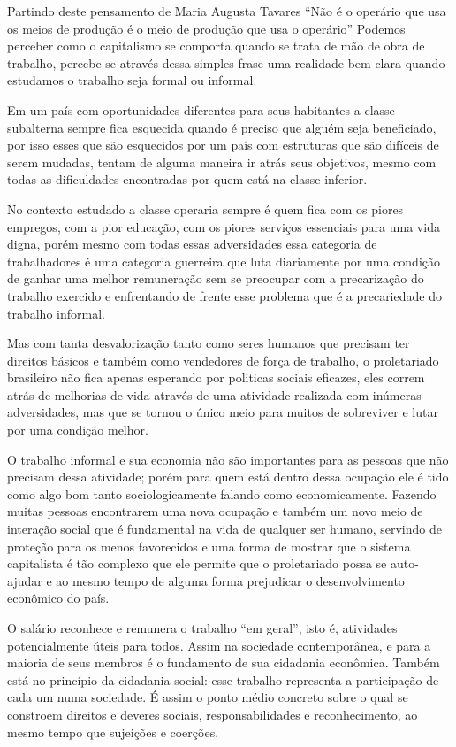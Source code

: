 Partindo deste pensamento de Maria Augusta Tavares ``Não é o operário que usa os meios de produção é o meio de produção
que usa o operário'' Podemos perceber como o capitalismo se comporta quando se trata de mão de obra de trabalho, 
percebe-se através dessa simples frase uma realidade bem clara quando estudamos o trabalho seja formal ou informal.

Em um país com oportunidades diferentes para seus habitantes a classe subalterna sempre fica esquecida quando é preciso
que alguém seja beneficiado, por isso esses que são esquecidos por um país com estruturas que são difíceis de serem 
mudadas, tentam de alguma maneira ir atrás seus objetivos, mesmo com todas as dificuldades encontradas por quem está
na classe inferior. 

No contexto estudado a classe operaria sempre é quem fica com os piores empregos, com a pior 
educação, com os piores serviços essenciais para uma vida digna, porém mesmo com todas essas adversidades essa categoria
de trabalhadores é uma categoria guerreira que luta diariamente por uma condição de ganhar uma melhor remuneração sem
se preocupar com a precarização do trabalho exercido e enfrentando de frente esse problema que é a precariedade do 
trabalho informal. 

Mas com tanta desvalorização tanto como seres humanos que precisam ter direitos básicos e também 
como vendedores de força de trabalho, o proletariado brasileiro não fica apenas esperando por politicas sociais eficazes,
eles correm atrás de melhorias de vida através de uma atividade realizada com inúmeras adversidades, mas que se tornou 
o único meio para muitos de sobreviver e lutar por uma condição melhor.

O trabalho informal e sua economia não são importantes para as pessoas que não precisam dessa atividade; porém para 
quem está dentro dessa ocupação ele é tido como algo bom tanto sociologicamente falando como economicamente. Fazendo
muitas pessoas encontrarem uma nova ocupação e também um novo meio de interação social que é fundamental na vida de 
qualquer ser humano, servindo de proteção para os menos favorecidos e uma forma de mostrar que o sistema capitalista 
é tão complexo que ele permite que o proletariado possa se auto-ajudar e ao mesmo tempo de alguma forma prejudicar o
desenvolvimento econômico do país. 

\begin{citacao}
O salário reconhece e remunera o trabalho ``em geral'', isto é, atividades potencialmente úteis para todos. Assim na
sociedade contemporânea, e para a maioria de seus membros é o fundamento de sua cidadania econômica. Também está no
princípio da cidadania social: esse trabalho representa a participação de cada um numa sociedade. É assim o ponto 
médio concreto sobre o qual se constroem direitos e deveres sociais, responsabilidades e reconhecimento, ao mesmo 
tempo que sujeições e coerções. \cite{castel1998metamorfoses}
\end{citacao}


